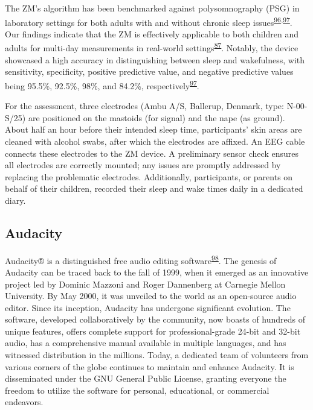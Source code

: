 \documentclass[
  9pt,
]{scrbook}
\begin{document}
The ZM's algorithm has been benchmarked against polysomnography (PSG) in
laboratory settings for both adults with and without chronic sleep
issues\textsuperscript{\protect\hyperlink{ref-wang_evaluation_2015}{96},\protect\hyperlink{ref-kaplan_performance_2014}{97}}.
Our findings indicate that the ZM is effectively applicable to both
children and adults for multi-day measurements in real-world
settings\textsuperscript{\protect\hyperlink{ref-hees_novel_2015}{87}}.
Notably, the device showcased a high accuracy in distinguishing between
sleep and wakefulness, with sensitivity, specificity, positive
predictive value, and negative predictive values being 95.5\%, 92.5\%,
98\%, and 84.2\%,
respectively\textsuperscript{\protect\hyperlink{ref-kaplan_performance_2014}{97}}.

For the assessment, three electrodes (Ambu A/S, Ballerup, Denmark, type:
N-00-S/25) are positioned on the mastoids (for signal) and the nape (as
ground). About half an hour before their intended sleep time,
participants' skin areas are cleaned with alcohol swabs, after which the
electrodes are affixed. An EEG cable connects these electrodes to the ZM
device. A preliminary sensor check ensures all electrodes are correctly
mounted; any issues are promptly addressed by replacing the problematic
electrodes. Additionally, participants, or parents on behalf of their
children, recorded their sleep and wake times daily in a dedicated
diary.

\hypertarget{audacity}{%
\subsection{Audacity}\label{audacity}}

Audacity®️ is a distinguished free audio editing
software\textsuperscript{\protect\hyperlink{ref-audacity}{98}}. The
genesis of Audacity can be traced back to the fall of 1999, when it
emerged as an innovative project led by Dominic Mazzoni and Roger
Dannenberg at Carnegie Mellon University. By May 2000, it was unveiled
to the world as an open-source audio editor. Since its inception,
Audacity has undergone significant evolution. The software, developed
collaboratively by the community, now boasts of hundreds of unique
features, offers complete support for professional-grade 24-bit and
32-bit audio, has a comprehensive manual available in multiple
languages, and has witnessed distribution in the millions. Today, a
dedicated team of volunteers from various corners of the globe continues
to maintain and enhance Audacity. It is disseminated under the GNU
General Public License, granting everyone the freedom to utilize the
software for personal, educational, or commercial endeavors.
\end{document}
